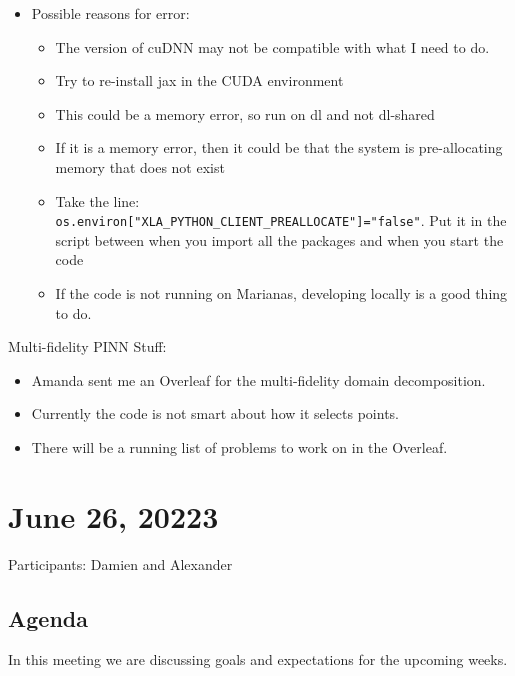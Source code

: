 \documentclass{article}
\begin{document}
\begin{itemize}
\item Possible reasons for error:
\begin{itemize}
\item The version of cuDNN may not be compatible with what I need to do.
\item Try to re-install jax in the CUDA environment
\item This could be a memory error, so run on dl and not dl-shared
\item If it is a memory error, then it could be that the system is pre-allocating memory that does not exist
\item Take the line: \verb|os.environ["XLA_PYTHON_CLIENT_PREALLOCATE"]="false"|. Put it in the script between when you import all the packages and when you start the code
\item If the code is not running on Marianas, developing locally is a good thing to do. 
\end{itemize}
\end{itemize}
Multi-fidelity PINN Stuff:
\begin{itemize}
\item Amanda sent me an Overleaf for the multi-fidelity domain decomposition.
\item Currently the code is not smart about how it selects points.
\item There will be a running list of problems to work on in the Overleaf.
\end{itemize}
\newpage
\section*{June 26, 20223}
Participants: Damien and Alexander
\subsection*{Agenda}
In this meeting we are discussing goals and expectations for the upcoming weeks.
\end{document}
